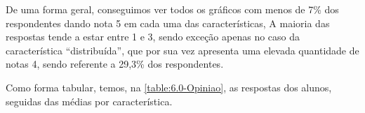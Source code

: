 \begin{apendicesenv}

  De uma forma geral, conseguimos ver todos os gráficos com menos de 7\% dos respondentes dando nota 5 em cada uma das características, A maioria das respostas tende a estar entre 1 e 3, sendo exceção apenas no caso da característica ``distribuída'', que por sua vez apresenta uma elevada quantidade de notas 4, sendo referente a 29,3\% dos respondentes.

  Como forma tabular, temos, na \autoref{table:6.0-Opiniao}, as respostas dos alunos, seguidas das médias por característica.


\end{apendicesenv}
